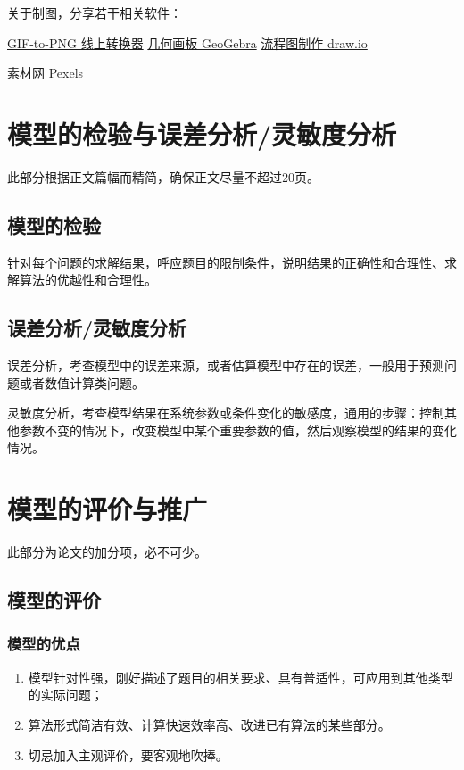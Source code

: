 \documentclass[12pt,utf8]{article}
\begin{document}
\begin{center}
\end{center}

关于制图，分享若干相关软件：

\href{https://www.cleverpdf.com/cn/gif-to-png}{GIF-to-PNG 线上转换器}
\qquad 
\href{https://www.geogebra.org/geometry}{几何画板 GeoGebra}
\qquad
\href{https://github.com/jgraph/drawio-desktop/releases}{流程图制作 draw.io}

\href{https://www.pexels.com/zh-cn/}{素材网 Pexels}
\qquad



\section{模型的检验与误差分析/灵敏度分析}

此部分根据正文篇幅而精简，确保正文尽量不超过20页。

\subsection{模型的检验}

针对每个问题的求解结果，呼应题目的限制条件，说明结果的正确性和合理性、求解算法的优越性和合理性。

\subsection{误差分析/灵敏度分析}

误差分析，考查模型中的误差来源，或者估算模型中存在的误差，一般用于预测问题或者数值计算类问题。

灵敏度分析，考查模型结果在系统参数或条件变化的敏感度，通用的步骤：控制其他参数不变的情况下，改变模型中某个重要参数的值，然后观察模型的结果的变化情况。



\section{模型的评价与推广}

此部分为论文的加分项，必不可少。

\subsection{模型的评价}

\subsubsection{模型的优点}
\begin{enumerate}
\item 模型针对性强，刚好描述了题目的相关要求、具有普适性，可应用到其他类型的实际问题；
\item 算法形式简洁有效、计算快速效率高、改进已有算法的某些部分。
\item 切忌加入主观评价，要客观地吹捧。
\end{enumerate}
\end{document}
